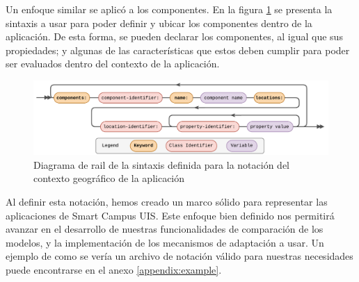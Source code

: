 Un enfoque similar se aplicó a los componentes. En la figura \ref{fig:rail-components} se presenta la sintaxis a usar para poder definir y ubicar los componentes dentro de la aplicación. De esta forma, se pueden declarar los componentes, al igual que sus propiedades; y algunas de las características que estos deben cumplir para poder ser evaluados dentro del contexto de la aplicación.

\begin{figure}[H]
    \centering
    \caption{Diagrama de rail de la sintaxis definida para la notación del contexto geográfico de la aplicación}
    \label{fig:rail-components}
    \vspace{2mm}
    \includegraphics[width=\linewidth]{images/Railroad Components.pdf}
\end{figure}

Al definir esta notación, hemos creado un marco sólido para representar las aplicaciones de Smart Campus UIS. Este enfoque bien definido nos permitirá avanzar en el desarrollo de nuestras funcionalidades de comparación de los modelos, y la implementación de los mecanismos de adaptación a usar. Un ejemplo de como se vería un archivo de notación válido para nuestras necesidades puede encontrarse en el anexo \ref{appendix:example}. 

